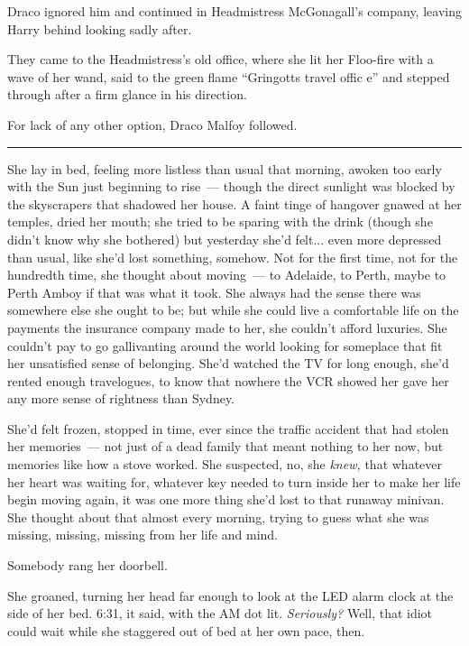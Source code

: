 Draco ignored him and continued in Headmistress McGonagall's company, leaving Harry behind looking sadly after.

They came to the Headmistress's old office, where she lit her Floo-fire with a wave of her wand, said to the green flame ``Gringotts travel offic e'' and stepped through after a firm glance in his direction.

For lack of any other option, Draco Malfoy followed.

\begin{center}\rule{3in}{0.4pt}\end{center}

She lay in bed, feeling more listless than usual that morning, awoken too early with the Sun just beginning to rise~--- though the direct sunlight was blocked by the skyscrapers that shadowed her house. A faint tinge of hangover gnawed at her temples, dried her mouth; she tried to be sparing with the drink (though she didn't know why she bothered) but yesterday she'd felt... even more depressed than usual, like she'd lost something, somehow. Not for the first time, not for the hundredth time, she thought about moving~--- to Adelaide, to Perth, maybe to Perth Amboy if that was what it took. She always had the sense there was somewhere else she ought to be; but while she could live a comfortable life on the payments the insurance company made to her, she couldn't afford luxuries. She couldn't pay to go gallivanting around the world looking for someplace that fit her unsatisfied sense of belonging. She'd watched the TV for long enough, she'd rented enough travelogues, to know that nowhere the VCR showed her gave her any more sense of rightness than Sydney.

She'd felt frozen, stopped in time, ever since the traffic accident that had stolen her memories~--- not just of a dead family that meant nothing to her now, but memories like how a stove worked. She suspected, no, she \emph{knew,} that whatever her heart was waiting for, whatever key needed to turn inside her to make her life begin moving again, it was one more thing she'd lost to that runaway minivan. She thought about that almost every morning, trying to guess what she was missing, missing, missing from her life and mind.

Somebody rang her doorbell.

She groaned, turning her head far enough to look at the LED alarm clock at the side of her bed. 6:31, it said, with the AM dot lit. \emph{Seriously?} Well, that idiot could wait while she staggered out of bed at her own pace, then.


